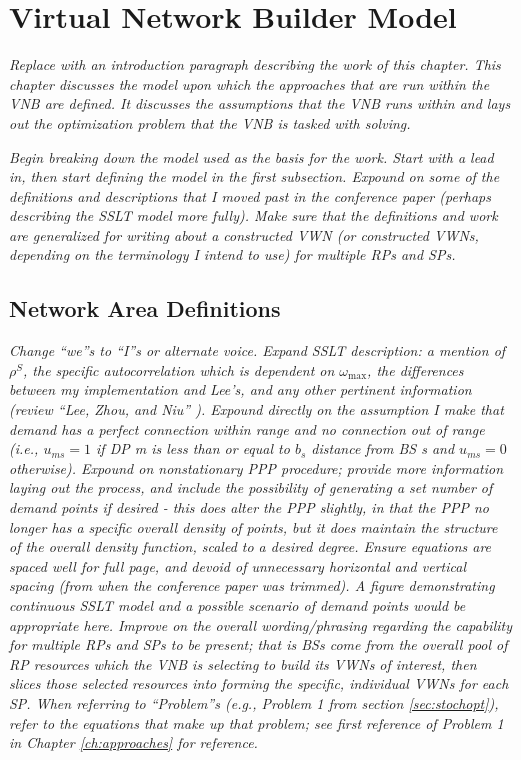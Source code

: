 \documentclass[12pt,dvipsnames]{report}
\begin{document}
\iftrue
\pagebreak
\chapter{Virtual Network Builder Model} \label{ch:vnbmodel}


\textit{Replace with an introduction paragraph describing the work of this chapter.  This chapter discusses the model upon which the approaches that are run within the VNB are defined.  It discusses the assumptions that the VNB runs within and lays out the optimization problem that the VNB is tasked with solving.}

\textit{Begin breaking down the model used as the basis for the work.  Start with a lead in, then start defining the model in the first subsection.  Expound on some of the definitions and descriptions that I moved past in the conference paper (perhaps describing the SSLT model more fully).  Make sure that the definitions and work are generalized for writing about a constructed VWN (or constructed VWNs, depending on the terminology I intend to use) for multiple RPs and SPs.}

\section{Network Area Definitions} \label{sec:networkdefs}

\textit{Change ``we''s to ``I''s or alternate voice.  Expand SSLT description: a mention of $\rho^S$, the specific autocorrelation which is dependent on $\omega_{\max}$, the differences between my implementation and Lee's, and any other pertinent information (review ``Lee, Zhou, and Niu'' \cite{6554749}).  Expound directly on the assumption I make that demand has a perfect connection within range and no connection out of range (i.e., $u_{ms} = 1$ if DP m is less than or equal to $b_s$ distance from BS s and $u_{ms} = 0$ otherwise).  Expound on nonstationary PPP procedure; provide more information laying out the process, and include the possibility of generating a set number of demand points if desired - this does alter the PPP slightly, in that the PPP no longer has a specific overall density of points, but it does maintain the structure of the overall density function, scaled to a desired degree.  Ensure equations are spaced well for full page, and devoid of unnecessary horizontal and vertical spacing (from when the conference paper was trimmed).  A figure demonstrating continuous SSLT model and a possible scenario of demand points would be appropriate here.  Improve on the overall wording/phrasing regarding the capability for multiple RPs and SPs to be present; that is BSs come from the overall pool of RP resources which the VNB is selecting to build its VWNs of interest, then slices those selected resources into forming the specific, individual VWNs for each SP.  When referring to ``Problem''s (e.g., Problem 1 from section \ref{sec:stochopt}), refer to the equations that make up that problem; see first reference of Problem 1 in Chapter \ref{ch:approaches} for reference.}
\end{document}
